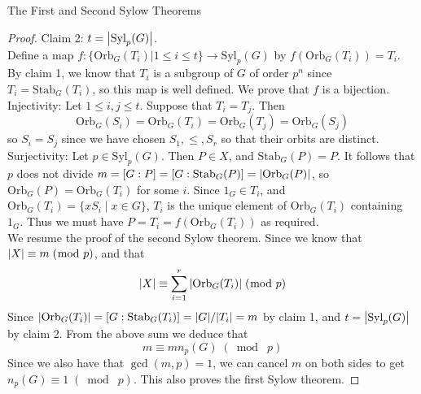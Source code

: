 \documentclass[a4paper]{article}
\begin{document}
\begin{thm}{The First and Second Sylow Theorems}{}
\begin{proof}
Claim 2: $t=\abs{\text{Syl}_p(G)}$. \\
Define a map $f:\{\text{Orb}_G(T_i)|1\leq i\leq t\}\to\text{Syl}_p(G)$ by $f(\text{Orb}_G(T_i))=T_i$. By claim 1, we know that $T_i$ is a subgroup of $G$ of order $p^n$ since $T_i=\text{Stab}_G(T_i)$, so this map is well defined. We prove that $f$ is a bijection. \\
Injectivity: Let $1\leq i,j\leq t$. Suppose that $T_i=T_j$. Then $$\text{Orb}_G(S_i)=\text{Orb}_G(T_i)=\text{Orb}_G(T_j)=\text{Orb}_G(S_j)$$ so $S_i=S_j$ since we have chosen $S_1,\leq,S_r$ so that their orbits are distinct. \\
Surjectivity: Let $p\in\text{Syl}_p(G)$. Then $P\in X$, and $\text{Stab}_G(P)=P$. It follows that $p$ does not divide $m=[G:P]=[G:\text{Stab}_G(P)]=\abs{\text{Orb}_G(P)}$, so $\text{Orb}_G(P)=\text{Orb}_G(T_i)$ for some $i$. Since $1_G\in T_i$, and $\text{Orb}_G(T_i)=\{xS_i\;|\;x\in G\}$, $T_i$ is the unique element of $\text{Orb}_G(T_i)$ containing $1_G$. Thus we must have $P=T_i=f(\text{Orb}_G(T_i))$ as required. \\

We resume the proof of the second Sylow theorem. Since we know that $\abs{X}\equiv m\;(\bmod\;p)$, and that $$\abs{X}\equiv\sum_{i=1}^r\abs{\text{Orb}_G(T_i)}\;(\bmod\;p)$$ Since $\abs{\text{Orb}_G(T_i)}=[G:\text{Stab}_G(T_i)]=\abs{G}/\abs{T_i}=m$ by claim 1, and $t=\abs{\text{Syl}_p(G)}$ by claim 2. From the above sum we deduce that $$m\equiv mn_p(G)\;(\bmod\;p)$$ Since we also have that $\gcd(m,p)=1$, we can cancel $m$ on both sides to get $n_p(G)\equiv1\;(\bmod\;p)$. This also proves the first Sylow theorem. 
\end{proof}
\end{thm}
\end{document}

